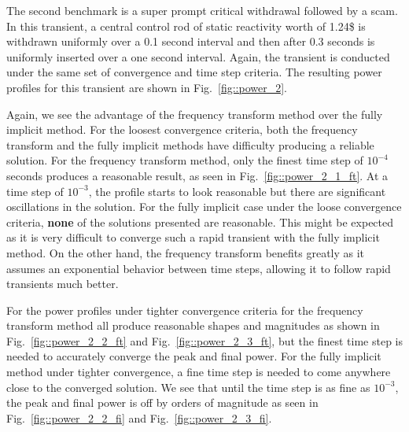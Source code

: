 \documentclass[12pt]{report}
\begin{document}
	The second benchmark is a super prompt critical withdrawal followed by a scam. In this transient, a central control rod of static reactivity worth of 1.24\$ is withdrawn uniformly over a 0.1 second interval and then after 0.3 seconds is uniformly inserted over a one second interval. Again, the transient is conducted under the same set of convergence and time step criteria. The resulting power profiles for this transient are shown in Fig.~\ref{fig::power_2}.
	
	Again, we see the advantage of the frequency transform method over the fully implicit method. For the loosest convergence criteria, both the frequency transform and the fully implicit methods have difficulty producing a reliable solution. For the frequency transform method, only the finest time step of $10^{-4}$ seconds produces a reasonable result, as seen in Fig.~\ref{fig::power_2_1_ft}. At a time step of $10^{-3}$, the profile starts to look reasonable but there are significant oscillations in the solution. For the fully implicit case under the loose convergence criteria, \textbf{none} of the solutions presented are reasonable. This might be expected as it is very difficult to converge such a rapid transient with the fully implicit method. On the other hand, the frequency transform benefits greatly as it assumes an exponential behavior between time steps, allowing it to follow rapid transients much better.
	
	For the power profiles under tighter convergence criteria for the frequency transform method all produce reasonable shapes and magnitudes as shown in Fig.~\ref{fig::power_2_2_ft} and Fig.~\ref{fig::power_2_3_ft}, but the finest time step is needed to accurately converge the peak and final power. For the fully implicit method under tighter convergence, a fine time step is needed to come anywhere close to the converged solution. We see that until the time step is as fine as $10^{-3}$, the peak and final power is off by orders of magnitude as seen in Fig.~\ref{fig::power_2_2_fi} and Fig.~\ref{fig::power_2_3_fi}.
	
\end{document}
